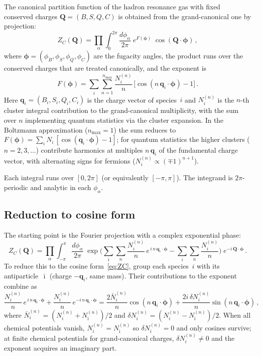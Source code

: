 \documentclass[11pt,a4paper]{article}
\newcommand{\bphi}{\bm{\phi}}
\newcommand{\bq}{\bm{q}}
\newcommand{\bQ}{\bm{Q}}
\begin{document}
The canonical partition function of the hadron resonance gas with fixed conserved charges $\bQ = (B, S, Q, C)$ is obtained from the grand-canonical one by projection:
\begin{equation}\label{eq:ZC}
  Z_C(\bQ) = \prod_{\alpha} \int_0^{2\pi} \frac{d\phi_\alpha}{2\pi}\;
  e^{F(\bphi)}\;
  \cos(\bQ \cdot \bphi)\,,
\end{equation}
where $\bphi = (\phi_B, \phi_S, \phi_Q, \phi_C)$ are the fugacity angles, the product runs over the conserved charges that are treated canonically, and the exponent is
\begin{equation}\label{eq:F-general}
  F(\bphi) = \sum_i \sum_{n=1}^{n_{\max}} \frac{N_i^{(n)}}{n}\,\bigl[\cos(n\,\bq_i \cdot \bphi) - 1\bigr]\,.
\end{equation}
Here $\bq_i = (B_i, S_i, Q_i, C_i)$ is the charge vector of species~$i$ and $N_i^{(n)}$ is the $n$-th cluster integral contribution to the grand-canonical multiplicity, with the sum over $n$ implementing quantum statistics via the cluster expansion.
In the Boltzmann approximation ($n_{\max} = 1$) the sum reduces to $F(\bphi) = \sum_i N_i\,[\cos(\bq_i \cdot \bphi) - 1]$; for quantum statistics the higher clusters ($n = 2, 3, \ldots$) contribute harmonics at multiples $n\,\bq_i$ of the fundamental charge vector, with alternating signs for fermions ($N_i^{(n)} \propto (\mp 1)^{n+1}$).

Each integral runs over $[0, 2\pi]$ (or equivalently $[-\pi, \pi]$).
The integrand is $2\pi$-periodic and analytic in each $\phi_\alpha$.

\subsection{Reduction to cosine form}
\label{sec:cosine-reduction}

The starting point is the Fourier projection with a complex exponential phase:
\begin{equation}\label{eq:ZC-complex}
  Z_C(\bQ) = \prod_{\alpha} \int_{-\pi}^{\pi} \frac{d\phi_\alpha}{2\pi}\;
  \exp\!\Bigg(\sum_i \sum_{n} \frac{N_i^{(n)}}{n}\,
  e^{\,i\,n\,\bq_i \cdot \bphi} - \sum_i \sum_{n} \frac{N_i^{(n)}}{n}\Bigg)\;
  e^{-i\,\bQ \cdot \bphi}\,.
\end{equation}
To reduce this to the cosine form~\cref{eq:ZC}, group each species~$i$ with its antiparticle~$\bar{\imath}$ (charge $-\bq_i$, same mass).
Their contributions to the exponent combine as
\begin{equation}\label{eq:pairing}
  \frac{N_i^{(n)}}{n}\,e^{\,i\,n\,\bq_i \cdot \bphi}
  + \frac{N_{\bar{\imath}}^{(n)}}{n}\,e^{-i\,n\,\bq_i \cdot \bphi}
  = \frac{2\bar{N}_i^{(n)}}{n}\cos(n\,\bq_i \cdot \bphi)
  + \frac{2i\,\delta N_i^{(n)}}{n}\sin(n\,\bq_i \cdot \bphi)\,,
\end{equation}
where $\bar{N}_i^{(n)} = (N_i^{(n)} + N_{\bar{\imath}}^{(n)})/2$ and $\delta N_i^{(n)} = (N_i^{(n)} - N_{\bar{\imath}}^{(n)})/2$.
When all chemical potentials vanish, $N_i^{(n)} = N_{\bar{\imath}}^{(n)}$ so $\delta N_i^{(n)} = 0$ and only cosines survive; at finite chemical potentials for grand-canonical charges, $\delta N_i^{(n)} \neq 0$ and the exponent acquires an imaginary part.
\end{document}
